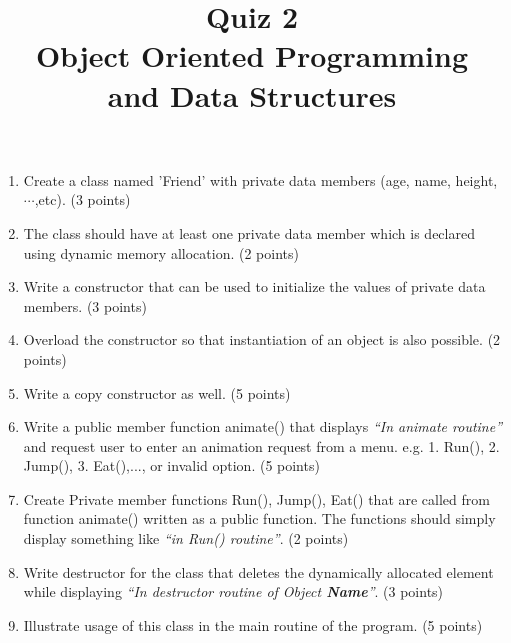 \documentclass[11pt]{article}
\title{\textbf{Quiz 2}\\ Object Oriented Programming\\ and Data Structures }
\date{}
\begin{document}
\maketitle
\begin{enumerate}
\item Create a class named 'Friend' with private data members (age, name,
height,$\cdots$,etc).  (3 points)
\item  The class should have at least one private data
member which is declared using dynamic memory allocation. (2 points)
\item  Write a constructor
that can be used to initialize the values of private data
members. (3 points)
\item  Overload the constructor so that instantiation of an object
is also possible. (2 points)
\item Write a copy constructor as well. (5 points)
\item Write a public member function animate() that displays \emph{``In animate routine''} and request user to enter an animation request from a menu.
e.g. 1. Run(), 2. Jump(), 3. Eat(),..., or invalid option. (5 points)
\item Create Private member functions Run(), Jump(), Eat() that are called from function animate() written as a public function. The functions should simply display something like \emph{``in Run() routine''}. (2 points)
\item Write destructor for the class that deletes the dynamically allocated element while displaying \emph{``In destructor routine of Object \textbf{Name}''}. (3 points)
\item Illustrate usage of this class in the main routine of the program. (5 points)
\end{enumerate}
\end{document}
